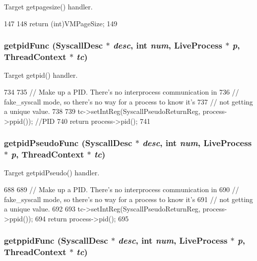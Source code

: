 Target getpagesize() handler. 


\begin{DoxyCode}
147 {
148     return (int)VMPageSize;
149 }
\end{DoxyCode}
\hypertarget{syscall__emul_8hh_afd43d1edeba9c138731579129c0e9a47}{
\subsubsection[{getpidFunc}]{ getpidFunc ({\bf SyscallDesc} $\ast$ {\em desc}, \/  int {\em num}, \/  {\bf LiveProcess} $\ast$ {\em p}, \/  {\bf ThreadContext} $\ast$ {\em tc})}}
\label{syscall__emul_8hh_afd43d1edeba9c138731579129c0e9a47}


Target getpid() handler. 


\begin{DoxyCode}
734 {
735     // Make up a PID.  There's no interprocess communication in
736     // fake_syscall mode, so there's no way for a process to know it's
737     // not getting a unique value.
738 
739     tc->setIntReg(SyscallPseudoReturnReg, process->ppid()); //PID
740     return process->pid();
741 }
\end{DoxyCode}
\hypertarget{syscall__emul_8hh_aefdd5bd75cc1a431a02db4b4ba62adf4}{
\subsubsection[{getpidPseudoFunc}]{ getpidPseudoFunc ({\bf SyscallDesc} $\ast$ {\em desc}, \/  int {\em num}, \/  {\bf LiveProcess} $\ast$ {\em p}, \/  {\bf ThreadContext} $\ast$ {\em tc})}}
\label{syscall__emul_8hh_aefdd5bd75cc1a431a02db4b4ba62adf4}


Target getpidPseudo() handler. 


\begin{DoxyCode}
688 {
689     // Make up a PID.  There's no interprocess communication in
690     // fake_syscall mode, so there's no way for a process to know it's
691     // not getting a unique value.
692 
693     tc->setIntReg(SyscallPseudoReturnReg, process->ppid());
694     return process->pid();
695 }
\end{DoxyCode}
\hypertarget{syscall__emul_8hh_a7bfc2fd0fff906f4fcf3798992aa385c}{
\subsubsection[{getppidFunc}]{ getppidFunc ({\bf SyscallDesc} $\ast$ {\em desc}, \/  int {\em num}, \/  {\bf LiveProcess} $\ast$ {\em p}, \/  {\bf ThreadContext} $\ast$ {\em tc})}}
\label{syscall__emul_8hh_a7bfc2fd0fff906f4fcf3798992aa385c}


